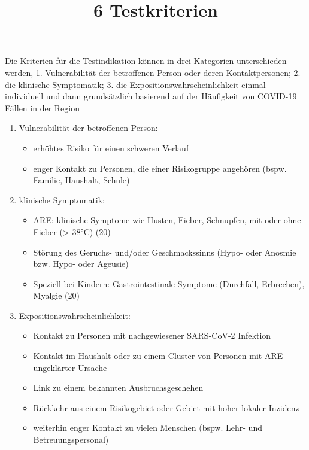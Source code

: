 \documentclass{article}
\begin{document}
\title{6 Testkriterien }

\maketitle


Die Kriterien für die Testindikation können in drei Kategorien unterschieden werden, 1. Vulnerabilität der betroffenen Person oder deren Kontaktpersonen; 2. die klinische Symptomatik; 3. die Expositionswahrscheinlichkeit einmal individuell und dann grundsätzlich basierend auf der Häufigkeit von COVID-19 Fällen in der Region 

\begin{enumerate}
\item Vulnerabilität der betroffenen Person: 

\begin{itemize}
\item  erhöhtes Risiko für einen schweren Verlauf 


\item  enger Kontakt zu Personen, die einer Risikogruppe angehören (bspw. Familie, Haushalt, Schule) 


\end{itemize}

\item klinische Symptomatik: 

\begin{itemize}
\item ARE: klinische Symptome wie Husten, Fieber, Schnupfen, mit oder ohne Fieber (> 38°C) (20) 


\item Störung des Geruchs- und/oder Geschmackssinns (Hypo- oder Anosmie bzw. Hypo- oder Ageusie) 


\item Speziell bei Kindern: Gastrointestinale Symptome (Durchfall, Erbrechen), Myalgie (20)


\end{itemize}

\item Expositionswahrscheinlichkeit:

\begin{itemize}
\item Kontakt zu Personen mit nachgewiesener SARS-CoV-2 Infektion


\item Kontakt im Haushalt oder zu einem Cluster von Personen mit ARE ungeklärter Ursache 


\item Link zu einem bekannten Ausbruchsgeschehen 


\item Rückkehr aus einem Risikogebiet oder Gebiet mit hoher lokaler Inzidenz 


\item weiterhin enger Kontakt zu vielen Menschen (bspw. Lehr- und Betreuungspersonal)


\end{itemize}

\end{enumerate}
\end{document}
